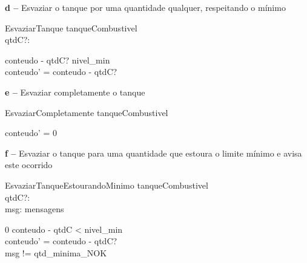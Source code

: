 \documentclass{article}
\begin{document}
\pagebreak

\textbf{d --} Esvaziar o tanque por uma quantidade qualquer, respeitando o mínimo
\begin{schema}{EsvaziarTanque}
    \Delta tanqueCombustivel\\
    qtdC?: \nat
    
    \where
    
    conteudo - qtdC? \geq nivel\_min\\
    conteudo' = conteudo - qtdC?
\end{schema}

\textbf{e --} Esvaziar completamente o tanque
\begin{schema}{EsvaziarCompletamente}
    \Delta tanqueCombustivel
    
    \where
    
    conteudo' = 0
\end{schema}

\textbf{f --} Esvaziar o tanque para uma quantidade que estoura o limite mínimo e avisa este ocorrido
\begin{schema}{EsvaziarTanqueEstourandoMinimo}
    \Delta tanqueCombustivel\\
    qtdC?: \nat\\
    msg: mensagens
    
    \where
    
    0 \leq conteudo - qtdC < nivel\_min\\
    conteudo' = conteudo - qtdC?\\
    msg != qtd\_minima\_NOK
\end{schema}
\end{document}

